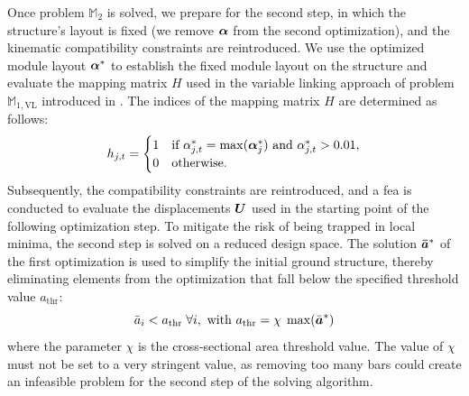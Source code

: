 Once problem $\mathbb{M}_2$ is solved, we prepare for the second step, in which the structure's layout is fixed (we remove $\bm{\alpha}$ from the second optimization), and the kinematic compatibility constraints are reintroduced. We use the optimized module layout $\bm{\alpha}^*$ to establish the fixed module layout on the structure and evaluate the mapping matrix $H$ used in the variable linking approach of problem $\mathbb{M}_{1,\text{VL}}$ introduced in . The indices of the mapping matrix $H$ are determined as follows:
\begin{equation}
    h_{j,t} =
    \begin{cases}
      1 & \text{if $\alpha^*_{j,t} = \max(\bm{\alpha}^*_{j})$ and $\alpha^*_{j,t}>0.01,$} \\
      0 & \text{otherwise.} 
    \end{cases}
\end{equation}
Subsequently, the compatibility constraints are reintroduced, and a \gls{fea} is conducted to evaluate the displacements $\bm{U}$ used in the starting point of the following optimization step. To mitigate the risk of being trapped in local minima, the second step is solved on a reduced design space. The solution $\bm{\bar{a}}^*$ of the first optimization is used to simplify the initial ground structure, thereby eliminating elements from the optimization that fall below the specified threshold value $a_{\text{thr}}$:
\begin{equation}
    \bar{a}_i<a_{\text{thr}} \; \forall i, \text{ with }a_{\text{thr}} = \chi \; \max(\bar{\bm{a}}^*)
    \label{eq:06_thr}
\end{equation}
where the parameter $\chi$ is the cross-sectional area threshold value. The value of $\chi$ must not be set to a very stringent value, as removing too many bars could create an infeasible problem for the second step of the solving algorithm.

